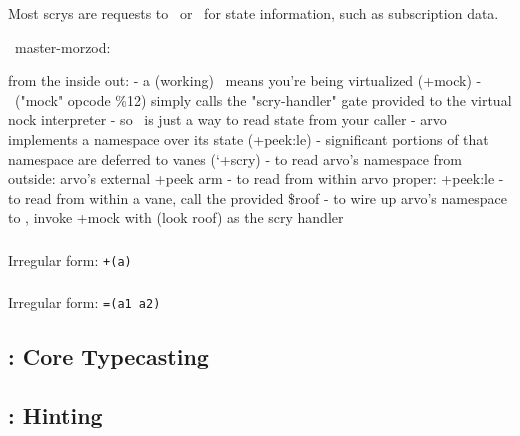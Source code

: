 \begin{lstlisting}

\end{lstlisting}

Most scrys are requests to \clay~or \gall~for state information, such as subscription data.


~master-morzod:

from the inside out:
- a (working) \dotket~means you're being virtualized (+mock)
- \dotket~("mock" opcode \%12) simply calls the "scry-handler" gate provided to the virtual nock interpreter
- so \dotket~is just a way to read state from your caller
- arvo implements a namespace over its state (+peek:le)
- significant portions of that namespace are deferred to vanes (`+scry)
- to read arvo's namespace from outside: arvo's external +peek arm
- to read from within arvo proper: +peek:le
- to read from within a vane, call the provided \$roof
- to wire up arvo's namespace to \dotket, invoke +mock with (look roof) as the scry handler


\subsubsection{\pdotlus}

Irregular form:  \texttt{+(a)}

\subsubsection{\pdottar}

\subsubsection{\pdottis}

Irregular form:  \texttt{=(a1 a2)}

\subsubsection{\pdotwut}

\subsection{\ket:  Core Typecasting}

\subsection{\psig:  Hinting}

